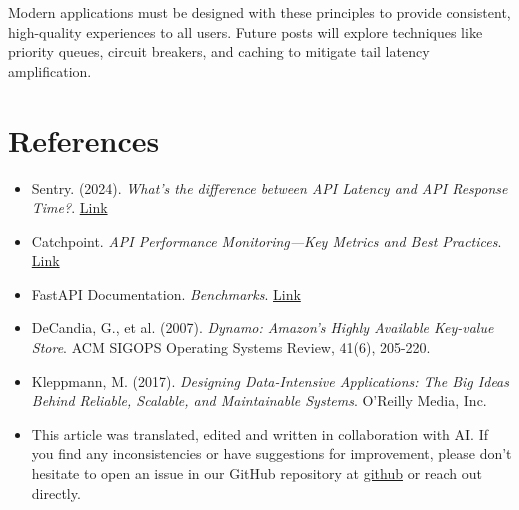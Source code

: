 \documentclass[12pt,letterpaper]{article}
\begin{document}
Modern applications must be designed with these principles to provide consistent, high-quality experiences to all users. Future posts will explore techniques like priority queues, circuit breakers, and caching to mitigate tail latency amplification.

\section{References}

\begin{itemize}
    \item Sentry. (2024). \textit{What’s the difference between API Latency and API Response Time?}. \href{https://blog.sentry.io/whats-the-difference-between-api-latency-and-api-response-time/#:~:text=API%20latency%20is%20the%20time,request%20and%20return%20the%20result.}{Link}
    \item Catchpoint. \textit{API Performance Monitoring—Key Metrics and Best Practices}. \href{https://www.catchpoint.com/api-monitoring-tools/api-performance-monitoring}{Link}
    \item FastAPI Documentation. \textit{Benchmarks}. \href{https://fastapi.tiangolo.com/benchmarks/}{Link}
    \item DeCandia, G., et al. (2007). \textit{Dynamo: Amazon’s Highly Available Key-value Store}. ACM SIGOPS Operating Systems Review, 41(6), 205-220.
    \item Kleppmann, M. (2017). \textit{Designing Data-Intensive Applications: The Big Ideas Behind Reliable, Scalable, and Maintainable Systems}. O'Reilly Media, Inc.
    \item This article was translated, edited and written in collaboration with AI. If you find any inconsistencies or have suggestions for improvement, please don't hesitate to open an issue in our GitHub repository at \href{https://github.com/asanchezyali/social-media-posts}{github} or reach out directly.
\end{itemize}
\end{document}
